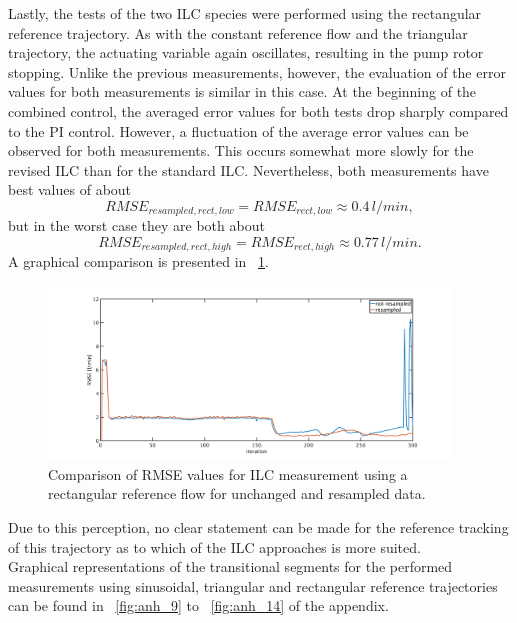Lastly, the tests of the two ILC species were performed using the rectangular reference trajectory.  As with the constant reference flow and the triangular trajectory, the actuating variable again oscillates, resulting in the pump rotor stopping.
Unlike the previous measurements, however, the evaluation of the error values for both measurements is similar in this case. At the beginning of the combined control, the averaged error values for both tests drop sharply compared to the PI control. However, a fluctuation of the average error values can be observed for both measurements. This occurs somewhat more slowly for the revised ILC than for the standard ILC. Nevertheless, both measurements have best values of about
\begin{equation}
  RMSE_{resampled,rect,low}=RMSE_{rect,low}\approx0.4\,l/min,
\end{equation}
but in the worst case they are both about
\begin{equation}
  RMSE_{resampled,rect,high}=RMSE_{rect,high}\approx0.77\,l/min.
\end{equation}
A graphical comparison is presented in \figurename~\ref{fig:RMSE_ilc_var_dist_comp_rect}.
\begin{figure}[ht!]
  \centering
  \includegraphics[width=0.95\textwidth]{images/chapt_5/ILC/RMSE_ilc_var_dist_comp_rect.pdf}
  \caption[Comparison of RMSE values for ILC measurement using a rectangular reference flow for unchanged and resampled data]{Comparison of RMSE values for ILC measurement using a rectangular reference flow for unchanged and resampled data.}
  \label{fig:RMSE_ilc_var_dist_comp_rect}
\end{figure}
Due to this perception, no clear statement can be made for the reference tracking of this trajectory as to which of the ILC approaches is more suited.
\\Graphical representations of the transitional segments for the performed measurements using sinusoidal, triangular and rectangular reference trajectories can be found in \figurename~\ref{fig:anh_9} to \figurename~\ref{fig:anh_14} of the appendix.

